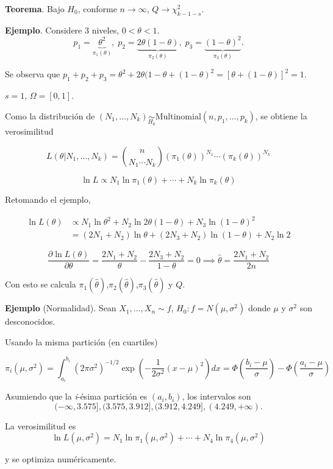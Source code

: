 \documentclass[
  12pt,
]{book}
\begin{document}
\textbf{Teorema}. Bajo \(H_0\), conforme \(n\to \infty\), \(Q\to \chi^2_{k-1-s}\).

\textbf{Ejemplo}. Considere 3 niveles, \(0<\theta<1\).
\[p_1 = \underbrace{\theta^2}_{\pi_1(\theta)},\;p_2 = \underbrace{2\theta(1-\theta)}_{\pi_2(\theta)},\;p_3 = \underbrace{(1-\theta)^2}_{\pi_3(\theta)}.\]

Se observa que \(p_1+p_2+p_3 = \theta^2 + 2\theta (1-\theta +(1-\theta)^2 =[\theta+(1-\theta)]^2 = 1\).

\(s = 1\), \(\Omega = [0,1]\).

Como la distribución de \((N_1,\dots,N_k)\underset{H_0}{\sim} \text{Multinomial}(n,p_1,\dots,p_k)\), se obtiene la verosimilitud

\[L (\theta|N_1,\dots,N_k) = {n \choose {N_1\cdots N_k}}(\pi_1(\theta))^{N_1}\cdots(\pi_k(\theta))^{N_k}\]

\[\ln L \propto N_1\ln\pi_1(\theta)+\cdots+N_k\ln\pi_k(\theta)\]

Retomando el ejemplo,

\begin{align*}
\ln L(\theta) & \propto N_1\ln \theta^2 + N_2 \ln 2\theta(1-\theta) + N_3\ln (1-\theta)^2\\
& = (2N_1+N_2)\ln \theta + (2N_3+N_2)\ln(1-\theta) + N_2\ln 2
\end{align*}

\[\dfrac{\partial \ln L(\theta)}{\partial\theta} = \dfrac{2N_1+N_2}{\theta}-\dfrac{2N_3+N_2}{1-\theta} = 0 \implies \hat\theta = \dfrac{2N_1+N_2}{2n}\]

Con esto se calcula \(\pi_1(\hat \theta)\),\(\pi_2(\hat \theta)\),\(\pi_3(\hat \theta)\) y \(Q\).

\textbf{Ejemplo} (Normalidad). Sean \(X_1,\dots,X_n\sim f\), \(H_0: f = N(\mu,\sigma^2)\) donde \(\mu\) y \(\sigma^2\) son desconocidos.

Usando la misma partición (en cuartiles)

\[\pi_i(\mu,\sigma^2) = \int_{a_i}^{b_i}(2\pi\sigma^2)^{-1/2}\exp\left(-\dfrac 1{2\sigma^2}(x-\mu)^2\right)dx = \Phi\left(\dfrac{b_i-\mu}{\sigma}\right)-\Phi\left(\dfrac{a_i-\mu}{\sigma}\right)\]

Asumiendo que la \emph{i}-ésima partición es \((a_i,b_i)\), los intervalos son
\[(-\infty,3.575],(3.575,3.912],(3.912,4.249], (4.249,+\infty).\]

La verosimilitud es
\[\ln L(\mu,\sigma^2) = N_1\ln \pi_1(\mu,\sigma^2)+\cdots+N_4\ln\pi_4(\mu,\sigma^2)\]

y se optimiza numéricamente.
\end{document}
